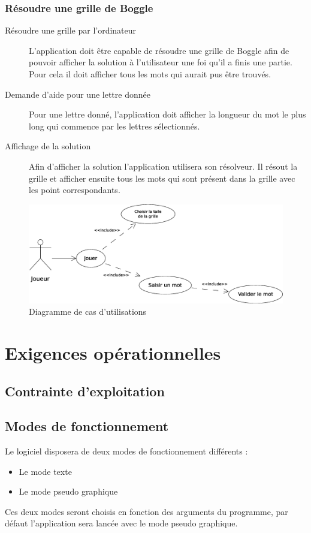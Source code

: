 \documentclass[12pt,a4paper,openany]{article}
\begin{document}
	\subsubsection{Résoudre une grille de Boggle}
		\begin{description}
			\item[Résoudre une grille par l'ordinateur] 
				L'application doit être capable de résoudre une grille de Boggle afin de pouvoir afficher la solution à l'utilisateur une foi qu'il a
				finis une partie. Pour cela il doit afficher tous les mots qui aurait pus être trouvés.
			\item[Demande d'aide pour une lettre donnée] Pour une lettre donné, l'application doit afficher la longueur du mot le plus long qui
				commence par les lettres sélectionnés.
			\item[Affichage de la solution] 
				Afin d'afficher la solution l'application utilisera son résolveur. Il résout la grille et afficher ensuite tous les mots qui sont
				présent dans la grille avec les point correspondants.
		\end{description}
		\begin{figure}[H]
			\includegraphics[width=15cm]{usecase.eps}
			\caption{Diagramme de cas d'utilisations}
		\end{figure}

	\section{Exigences opérationnelles} %
	\subsection{Contrainte d'exploitation}
	\subsection{Modes de fonctionnement}
	Le logiciel disposera de deux modes de fonctionnement différents :
	\begin{itemize}
		\item Le mode texte
		\item Le mode pseudo graphique
	\end{itemize}
	Ces deux modes seront choisis en fonction des arguments du programme, par défaut l'application sera lancée avec le mode pseudo graphique.
\end{document}
